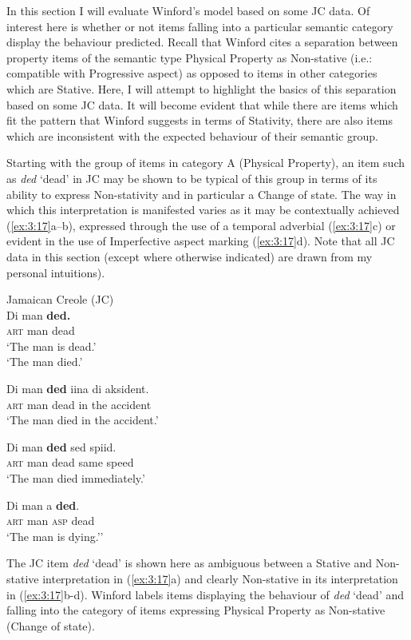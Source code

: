 In this section I will evaluate Winford’s model based on some JC
data. Of interest here is whether or not items falling into a
particular semantic category display the behaviour predicted.  Recall
that Winford cites a separation between property items of the semantic
type Physical Property as Non-stative (i.e.: compatible with
Progressive aspect) as opposed to items in other categories which are
Stative.  Here, I will attempt to highlight the basics of this
separation based on some JC data.  It will become evident that while
there are items which fit the pattern that Winford suggests in terms
of Stativity, there are also items which are inconsistent with the
expected behaviour of their semantic group.

Starting with the group of items in category A (Physical Property), an
item such as \textit{ded} `dead' in JC may be shown to be typical of
this group in terms of its ability to express Non-stativity and in
particular a Change of state.  The way in which this interpretation is
manifested varies as it may be contextually achieved (\ref{ex:3:17}a--b),
expressed through the use of a temporal adverbial (\ref{ex:3:17}c) or
evident in the use of Imperfective aspect marking (\ref{ex:3:17}d).
Note that all JC data in this section (except where otherwise
indicated) are drawn from my personal intuitions). 

\ea%
\label{ex:3:17}
Jamaican Creole  (JC)\\
  \ea
 	 \gll Di man \textbf{ded.}\\
  \textsc{art} man dead        \\
    \ea   `The man is dead.'\\
    \ex  `The man died.'\\
    \z 

  \ex
  \gll Di man \textbf{ded} iina di aksident.\\
  \textsc{art} man dead in the accident    \\
  \glt `The man died in the accident.'

  \ex
  \gll Di man \textbf{ded} sed spiid.\\
  \textsc{art} man dead same speed      \\
  \glt `The man died immediately.'

  \ex
  \gll			 Di man      				a \textbf{ded}.\\
  \textsc{art} man \textsc{asp} dead        \\
  \glt `The man is dying.'' 
  \z
\z

The JC item \textit{ded} `dead' is shown here as ambiguous between a
Stative and Non-stative interpretation in (\ref{ex:3:17}a) and clearly
Non-stative in its interpretation in (\ref{ex:3:17}b-d).  Winford
labels items displaying the behaviour of \textit{ded} `dead' and
falling into the category of items expressing Physical Property as
Non-stative (Change of state).

